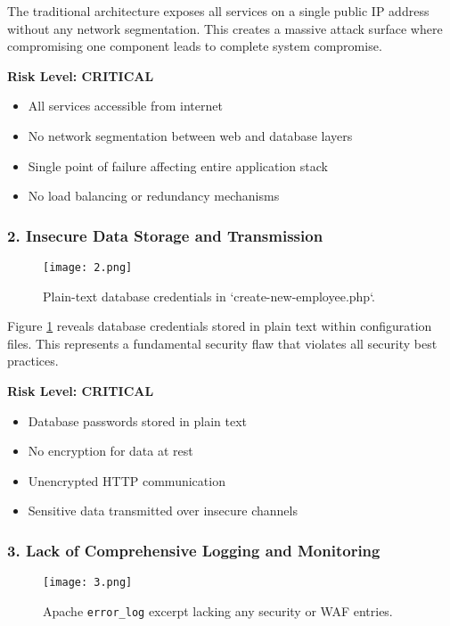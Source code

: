 \documentclass[12pt]{article}
\begin{document}
The traditional architecture exposes all services on a single public IP address without any network segmentation. This creates a massive attack surface where compromising one component leads to complete system compromise.

\textbf{Risk Level: CRITICAL}
\begin{itemize}
\item All services accessible from internet
\item No network segmentation between web and database layers
\item Single point of failure affecting entire application stack
\item No load balancing or redundancy mechanisms
\end{itemize}

\subsubsection{2. Insecure Data Storage and Transmission}

\begin{figure}[H]
\centering
\texttt{[image: 2.png]}
\caption{Plain-text database credentials in `create-new-employee.php`.}
\label{fig:plain_credentials}
\end{figure}

Figure \ref{fig:plain_credentials} reveals database credentials stored in plain text within configuration files. This represents a fundamental security flaw that violates all security best practices.

\textbf{Risk Level: CRITICAL}
\begin{itemize}
\item Database passwords stored in plain text
\item No encryption for data at rest
\item Unencrypted HTTP communication
\item Sensitive data transmitted over insecure channels
\end{itemize}

\subsubsection{3. Lack of Comprehensive Logging and Monitoring}

\begin{figure}[H]
\centering
\texttt{[image: 3.png]}
\caption{Apache \texttt{error\_log} excerpt lacking any security or WAF entries.}
\label{fig:no_monitoring}
\end{figure}
\end{document}
